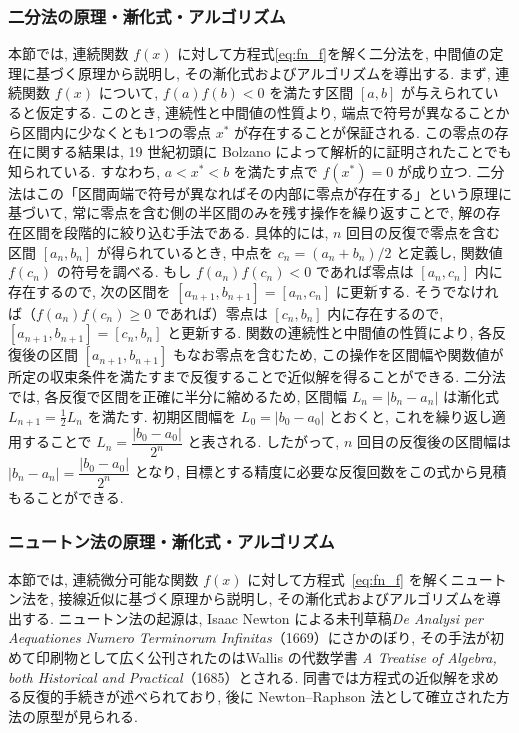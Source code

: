 \documentclass[a4paper,fontsize=11pt,line_length=40zw,number_of_lines=35,baselineskip=1.7zw]{jlreq}
\begin{document}
\subsubsection{二分法の原理・漸化式・アルゴリズム}
\label{sbsbsec:bisec}
本節では, 連続関数 $f(x)$ に対して方程式\ref{eq:fn_f}を解く二分法を, 中間値の定理に基づく原理から説明し, 
その漸化式およびアルゴリズムを導出する. 
まず, 連続関数 $f(x)$ について, $f(a)f(b)<0$ を満たす区間 $[a,b]$ が与えられていると仮定する. 
このとき, 連続性と中間値の性質より, 端点で符号が異なることから区間内に少なくとも1つの零点 $x^*$ が存在することが保証される. 
この零点の存在に関する結果は, 19 世紀初頭に Bolzano によって解析的に証明されたことでも知られている. \cite{bernardReinAnalytischerBeweis1817}
すなわち, $a<x^*<b$ を満たす点で $f(x^*)=0$ が成り立つ. 二分法はこの「区間両端で符号が異なればその内部に零点が存在する」という原理に基づいて, 
常に零点を含む側の半区間のみを残す操作を繰り返すことで, 解の存在区間を段階的に絞り込む手法である. 
具体的には, $n$ 回目の反復で零点を含む区間 $[a_n,b_n]$ が得られているとき, 
中点を $c_n=(a_n+b_n)/2$ と定義し, 関数値 $f(c_n)$ の符号を調べる. 
もし $f(a_n)f(c_n)<0$ であれば零点は $[a_n,c_n]$ 内に存在するので, 
次の区間を $[a_{n+1},b_{n+1}]=[a_n,c_n]$ に更新する. 
そうでなければ（$f(a_n)f(c_n)\ge 0$ であれば）零点は $[c_n,b_n]$ 内に存在するので, 
$[a_{n+1},b_{n+1}]=[c_n,b_n]$ と更新する. 
関数の連続性と中間値の性質により, 各反復後の区間 $[a_{n+1},b_{n+1}]$ もなお零点を含むため, 
この操作を区間幅や関数値が所定の収束条件を満たすまで反復することで近似解を得ることができる. 
二分法では, 各反復で区間を正確に半分に縮めるため, 区間幅 $L_n=|b_n-a_n|$ は漸化式 $L_{n+1}=\tfrac{1}{2}L_n$ を満たす. 
初期区間幅を $L_0=|b_0-a_0|$ とおくと, これを繰り返し適用することで $L_n=\dfrac{|b_0-a_0|}{2^n}$ と表される. 
したがって, $n$ 回目の反復後の区間幅は $|b_n-a_n|=\dfrac{|b_0-a_0|}{2^n}$ となり, 目標とする精度に必要な反復回数をこの式から見積もることができる. 

\subsubsection{ニュートン法の原理・漸化式・アルゴリズム}
\label{sbsbsec:newton}
本節では, 連続微分可能な関数 $f(x)$ に対して方程式~\eqref{eq:fn_f} を解くニュートン法を, 接線近似に基づく原理から説明し, 
その漸化式およびアルゴリズムを導出する. 
ニュートン法の起源は, Isaac Newton による未刊草稿\emph{De Analysi per Aequationes Numero Terminorum Infinitas}（1669）にさかのぼり, \cite{newtonAnalysiAequationesNumero1669}
その手法が初めて印刷物として広く公刊されたのはWallis の代数学書 \emph{A Treatise of Algebra, both Historical and Practical}（1685）とされる. \cite{wallisTreatiseAlgebra1685}
同書では方程式の近似解を求める反復的手続きが述べられており, 後に Newton--Raphson 法として確立された方法の原型が見られる. 
\end{document}
